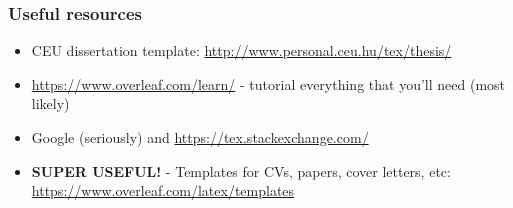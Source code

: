 \documentclass{beamer}
\begin{document}

\begin{frame}
\frametitle{Useful resources}
\begin{itemize}
\item CEU dissertation template: \url{http://www.personal.ceu.hu/tex/thesis/}
\item \url{https://www.overleaf.com/learn/} - tutorial everything that you'll need (most likely)
\item Google (seriously) and \url{https://tex.stackexchange.com/}
\item \textbf{SUPER USEFUL!} - Templates for CVs, papers, cover letters, etc: \url{https://www.overleaf.com/latex/templates}
\end{itemize}
\end{frame}


\end{document}
